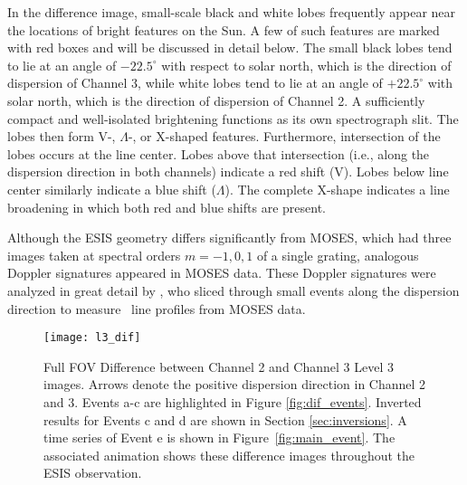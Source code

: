     	
    	In the difference image, small-scale black and white lobes frequently appear near the locations of bright features on the Sun. A few of such features are marked with red boxes and will be discussed in detail below.  
    	The small black lobes tend to lie at an angle of $-22.5^\circ$ with respect to solar north, which is the direction of dispersion of Channel 3, while white lobes tend to lie at an angle of $+22.5^\circ$ with solar north, which is the direction of dispersion of Channel 2. A sufficiently compact and well-isolated brightening functions as its own spectrograph slit. 
    	The lobes then form V-, $\Lambda$-, or X-shaped features. 
    	Furthermore, intersection of the lobes occurs at the line center. 
    	Lobes above that intersection (i.e., along the dispersion direction in both channels) indicate a red shift (V). 
    	Lobes below line center similarly indicate a blue shift ($\Lambda$). The complete X-shape indicates a line broadening in which both red and blue shifts are present.
    	
    	Although the ESIS geometry differs significantly from MOSES, which had three images taken at spectral orders $m=-1, 0, 1$
    	of a single grating, analogous Doppler signatures appeared in MOSES data. These Doppler signatures were analyzed in great detail by \citet{Rust2019}, who sliced through small events along the dispersion direction to measure \heii \ line profiles from MOSES data.
    	    
   		
  		\begin{figure}
  			\centering
  			\texttt{[image: l3\_dif]}
  			\caption{Full FOV Difference between Channel 2 and Channel 3 Level 3 images.  
  			Arrows denote the positive dispersion direction in Channel 2 and 3.
  			Events a-c are highlighted in Figure \ref{fig:dif_events}.    
  			Inverted results for Events c and d are shown in Section \ref{sec:inversions}. 
  			A time series of Event e is shown in Figure~\ref{fig:main_event}.
  			The associated animation shows these difference images throughout the ESIS observation.	
  	}
  			\label{fig:l3_dif}
  		\end{figure}
   	
